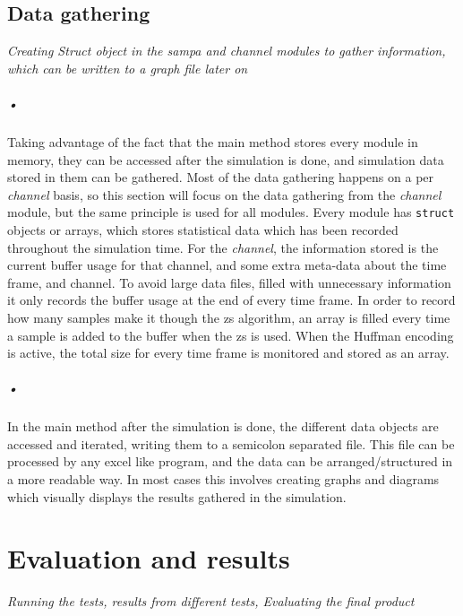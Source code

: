 \documentclass[a4paper, 12pt]{report}
\newcommand{\codeword}[1]{\texttt{#1}}
\begin{document}
\begin{minipage}{\linewidth}

\end{minipage}

\section{Data gathering}
\textit{Creating Struct object in the sampa and channel modules to gather information, which can be written to a graph file later on}

\paragraph{•}
Taking advantage of the fact that the main method stores every module in memory, they can be accessed after the simulation is done, and simulation data stored in them can be gathered.
Most of the data gathering happens on a per \textit{channel} basis, so this section will focus on the data gathering from the \textit{channel} module, but the same principle is used for all modules.
Every module has \codeword{struct} objects or arrays, which stores statistical data which has been recorded throughout the simulation time.
For the \textit{channel}, the information stored is the current buffer usage for that channel, and some extra meta-data about the time frame, and channel.
To avoid large data files, filled with unnecessary information it only records the buffer usage at the end of every time frame.
In order to record how many samples make it though the \gls{zs} algorithm, an array is filled every time a sample is added to the buffer when the \gls{zs} is used.
When the Huffman encoding is active, the total size for every time frame is monitored and stored as an array.

\paragraph{•}
In the main method after the simulation is done, the different data objects are accessed and iterated, writing them to a semicolon separated file.
This file can be processed by any excel like program, and the data can be arranged/structured in a more readable way.
In most cases this involves creating graphs and diagrams which visually displays the results gathered in the simulation.

\chapter{Evaluation and results}
\textit{Running the tests, results from different tests, Evaluating the final product}
\end{document}
